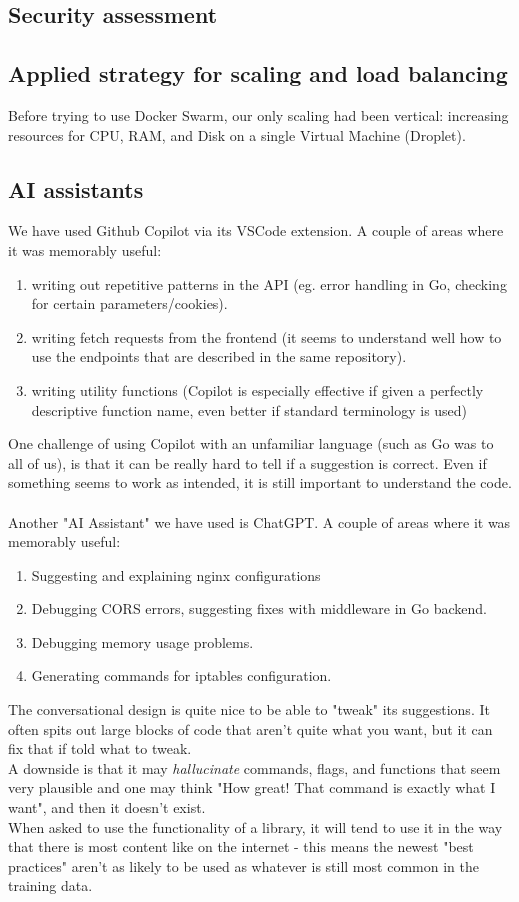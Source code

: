 \subsection{Security assessment}

\subsection{Applied strategy for scaling and load balancing}
Before trying to use Docker Swarm, our only scaling had been vertical: increasing resources for CPU, RAM, and Disk on a single Virtual Machine (Droplet). 

\subsection{AI assistants}
We have used Github Copilot via its VSCode extension.
A couple of areas where it was memorably useful:
\begin{enumerate}
    \item writing out repetitive patterns in the API (eg. error handling in Go, checking for certain parameters/cookies).
    \item writing fetch requests from the frontend (it seems to understand well how to use the endpoints that are described in the same repository).
    \item writing utility functions (Copilot is especially effective if given a perfectly descriptive function name, even better if standard terminology is used)
\end{enumerate} 
One challenge of using Copilot with an unfamiliar language (such as Go was to all of us), is that it can be really hard to tell if a suggestion is correct. Even if something seems to work as intended, it is still important to understand the code. \\\\
Another "AI Assistant" we have used is ChatGPT. A couple of areas where it was memorably useful: 
\begin{enumerate}
    \item Suggesting and explaining nginx configurations
    \item Debugging CORS errors, suggesting fixes with middleware in Go backend.
    \item Debugging memory usage problems. 
    \item Generating commands for iptables configuration.
\end{enumerate}
The conversational design is quite nice to be able to "tweak" its suggestions. It often spits out large blocks of code that aren't quite what you want, but it can fix that if told what to tweak. \\
A downside is that it may \textit{hallucinate} commands, flags, and functions that seem very plausible and one may think "How great! That command is exactly what I want", and then it doesn't exist. \\
When asked to use the functionality of a library, it will tend to use it in the way that there is most content like on the internet - this means the newest "best practices" aren't as likely to be used as whatever is still most common in the training data.  